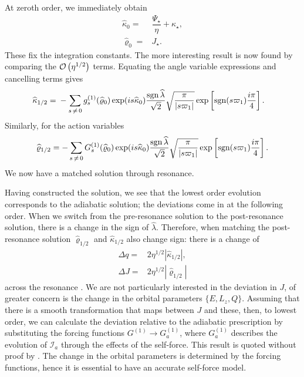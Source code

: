 At zeroth order, we immediately obtain
\begin{align}
\widehat{\kappa}_0 = {} & \dfrac{\Psi_\star}{\eta} + \kappa_\star, \\
\widehat{\varrho}_0 = {} & J_\star.
\end{align}
These fix the integration constants. The more interesting result is now found by comparing the $\mathcal{O}\left({\eta^{1/2}}\right)$ terms. Equating the angle variable expressions and cancelling terms gives
\begin{align}
\widehat{\kappa}_{1/2} = {} & -\sum_{s\,\neq\,0}g_s^{(1)}(\widehat{\varrho}_0)\exp(is \widehat{\kappa}_0)\dfrac{\operatorname{sgn} \widehat{\lambda}}{\sqrt{2}}\sqrt{\dfrac{\pi}{|s\varpi_1|}}\exp\left[\operatorname{sgn}(s\varpi_1)\dfrac{i\pi}{4}\right].
\end{align}
Similarly, for the action variables
\begin{equation}
\widehat{\varrho}_{1/2} = -\sum_{s\,\neq\,0}G_s^{(1)}(\widehat{\varrho}_0)\exp(is \widehat{\kappa}_0)\dfrac{\operatorname{sgn} \widehat{\lambda}}{\sqrt{2}}\sqrt{\dfrac{\pi}{|s\varpi_1|}}\exp\left[\operatorname{sgn}(s\varpi_1)\dfrac{i\pi}{4}\right].
\label{eq:J-1/2}
\end{equation}
We now have a matched solution through resonance.

Having constructed the solution, we see that the lowest order evolution corresponds to the adiabatic solution; the deviations come in at the following order. When we switch from the pre-resonance solution to the post-resonance solution, there is a change in the sign of $\widehat{\lambda}$. Therefore, when matching the post-resonance solution $\widehat{\varrho}_{1/2}$ and $\widehat{\kappa}_{1/2}$ also change sign: there is a change of
\begin{align}
\Delta q = {} & 2 \eta^{1/2}\left|\widehat{\kappa}_{1/2}\right|, \\
\Delta J = {} & 2 \eta^{1/2}\left|\widehat{\varrho}_{1/2}\right|
\label{eq:jumps}
\end{align}
across the resonance \citep{Kevorkian1987}. We are not particularly interested in the deviation in $J$, of greater concern is the change in the orbital parameters $\{E,L_z,Q\}$. Assuming that there is a smooth transformation that maps between $J$ and these, then, to lowest order, we can calculate the deviation relative to the adiabatic prescription by substituting the forcing functions $G^{(1)} \rightarrow G_a^{(1)}$, where $G_a^{(1)}$ describes the evolution of $\mathcal{I}_a$ through the effects of the self-force. This result is quoted without proof by \citet{Flanagan2012}. The change in the orbital parameters is determined by the forcing functions, hence it is essential to have an accurate self-force model.

